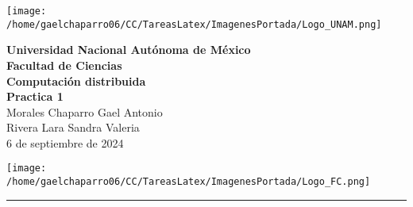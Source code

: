 
\begin{center}
    \begin{minipage}{3cm}
    	\begin{center}
    		\texttt{[image: /home/gaelchaparro06/CC/TareasLatex/ImagenesPortada/Logo\_UNAM.png]}
    	\end{center}
    \end{minipage}\hfill
    \begin{minipage}{10cm}
    	\begin{center}
    	\textbf{\large Universidad Nacional Autónoma de México}\\[0.1cm]
        \textbf{Facultad de Ciencias}\\[0.1cm]
        \textbf{Computación distribuida}\\[0.1cm]
        \textbf{Practica 1}\\[0.1cm]
        Morales Chaparro Gael Antonio\\[0.1cm]
        Rivera Lara Sandra Valeria \\[0.1cm]
       6 de septiembre de 2024
    	\end{center}
    \end{minipage}\hfill
    \begin{minipage}{3cm}
    	\begin{center}
    		\texttt{[image: /home/gaelchaparro06/CC/TareasLatex/ImagenesPortada/Logo\_FC.png]}
    	\end{center}
    \end{minipage}
\end{center}

\rule{17cm}{0.1mm}

